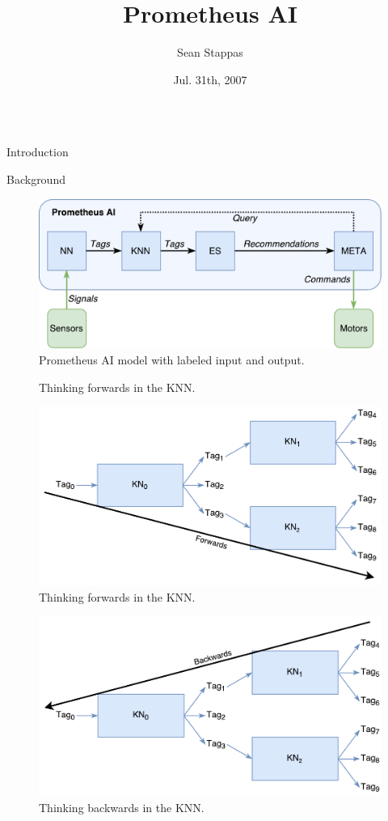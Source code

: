 \documentclass[final]{beamer} %
\title[Fancy Posters]{Prometheus AI}
\author{Sean Stappas}
\institute[RWTH Aachen University]{McGill University}
\date{Jul. 31th, 2007}
\begin{document}
\begin{columns}
	\begin{column}{.3\textwidth}
			\begin{block}{Introduction}
			\end{block}
			\begin{block}{Background}
				\begin{figure}[!htb]
					\includegraphics[width=\textwidth]{figures/ai_model_labeled.pdf}
					\caption{Prometheus AI model with labeled input and output.}
					\label{model_labeled}
				\end{figure}
			
				\begin{figure}[!htb]
					\centering
					\caption{Thinking forwards in the KNN.}
				\end{figure}
				\begin{figure}[!htb]
					\includegraphics[width=0.5\columnwidth]{figures/forwards_thinking.pdf}
					\caption{Thinking forwards in the KNN.}
					\label{think_forwards}
				\end{figure}
				
				\begin{figure}[!htb]
					\includegraphics[width=0.5\columnwidth]{figures/backwards_thinking.pdf}
					\caption{Thinking backwards in the KNN.}
					\label{think_backwards}
				\end{figure}
				

\end{block}
\end{column}
\end{columns}
\end{document}
